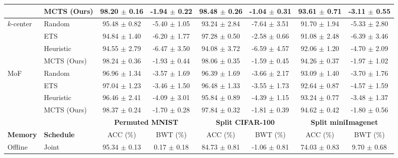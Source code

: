 \begin{tabular}{llcccccc}
	& MCTS (Ours)            & 98.20 $\pm$ 0.16      & -1.94 $\pm$ 0.22     & 98.48 $\pm$ 0.26         & -1.04 $\pm$ 0.31         & 93.61 $\pm$ 0.71       & -3.11 $\pm$ 0.55       \\ \midrule
	\multirow{4}{*}{$k$-center} & Random          & 95.48 $\pm$ 0.82      & -5.40 $\pm$ 1.05     & 93.24 $\pm$ 2.84         & -7.64 $\pm$ 3.51         & 91.70 $\pm$ 1.94       & -5.33 $\pm$ 2.80       \\
	& ETS             & 94.84 $\pm$ 1.40      & -6.20 $\pm$ 1.77     & 97.28 $\pm$ 0.50         & -2.58 $\pm$ 0.66         & 91.08 $\pm$ 2.48       & -6.39 $\pm$ 3.46       \\
	& Heuristic         & 94.55 $\pm$ 2.79      & -6.47 $\pm$ 3.50     & 94.08 $\pm$ 3.72         & -6.59 $\pm$ 4.57         & 92.06 $\pm$ 1.20       & -4.70 $\pm$ 2.09       \\
	& MCTS (Ours)            & 98.24 $\pm$ 0.36      & -1.93 $\pm$ 0.44     & 98.06 $\pm$ 0.35         & -1.59 $\pm$ 0.45         & 94.26 $\pm$ 0.37       & -1.97 $\pm$ 1.02       \\ \midrule
	\multirow{4}{*}{MoF}             & Random          & 96.96 $\pm$ 1.34      & -3.57 $\pm$ 1.69     & 96.39 $\pm$ 1.69         & -3.66 $\pm$ 2.17         & 93.09 $\pm$ 1.40       & -3.70 $\pm$ 1.76       \\
	& ETS             & 97.04 $\pm$ 1.23      & -3.46 $\pm$ 1.50     & 96.48 $\pm$ 1.33         & -3.55 $\pm$ 1.73         & 92.64 $\pm$ 0.87       & -4.57 $\pm$ 1.59       \\
	& Heuristic         & 96.46 $\pm$ 2.41      & -4.09 $\pm$ 3.01     & 95.84 $\pm$ 0.89         & -4.39 $\pm$ 1.15         & 93.24 $\pm$ 0.77       & -3.48 $\pm$ 1.37       \\
	& MCTS (Ours)            & 98.37 $\pm$ 0.24      & -1.70 $\pm$ 0.28     & 97.84 $\pm$ 0.32         & -1.81 $\pm$ 0.39         & 94.62 $\pm$ 0.42       & -1.80 $\pm$ 0.56       \\ 
	\bottomrule
	\toprule
	&         & \multicolumn{2}{c}{\textbf{Permuted MNIST}} & \multicolumn{2}{c}{\textbf{Split CIFAR-100}} & \multicolumn{2}{c}{\textbf{Split miniImagenet}} \\ \midrule 
	\textbf{Memory}                 & \textbf{Schedule}  & ACC (\%)        & BWT (\%)         & ACC (\%)         & BWT (\%)         & ACC (\%)          & BWT (\%)           \\ \midrule 
	Offline                   & Joint   & 95.34 $\pm$ 0.13  & 0.17 $\pm$ 0.18    & 84.73 $\pm$ 0.81   & -1.06 $\pm$ 0.81   & 74.03 $\pm$ 0.83    & 9.70 $\pm$ 0.68      \\ \midrule 

\end{tabular}
